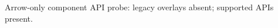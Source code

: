 \documentclass{article}
\begin{document}
Arrow-only component API probe: legacy overlays absent; supported APIs present.
\end{document}
